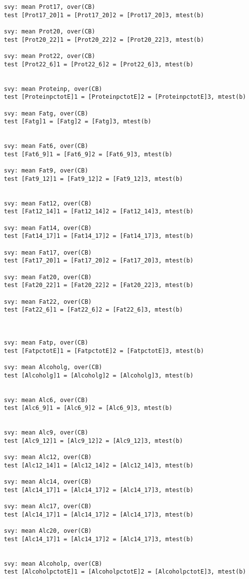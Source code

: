 \documentclass[]{article}
\begin{document}
\begin{verbatim}
svy: mean Prot17, over(CB)
test [Prot17_20]1 = [Prot17_20]2 = [Prot17_20]3, mtest(b) 

svy: mean Prot20, over(CB)
test [Prot20_22]1 = [Prot20_22]2 = [Prot20_22]3, mtest(b) 

svy: mean Prot22, over(CB)
test [Prot22_6]1 = [Prot22_6]2 = [Prot22_6]3, mtest(b) 


svy: mean Proteinp, over(CB)
test [ProteinpctotE]1 = [ProteinpctotE]2 = [ProteinpctotE]3, mtest(b) 

svy: mean Fatg, over(CB)
test [Fatg]1 = [Fatg]2 = [Fatg]3, mtest(b) 


svy: mean Fat6, over(CB)
test [Fat6_9]1 = [Fat6_9]2 = [Fat6_9]3, mtest(b) 

svy: mean Fat9, over(CB)
test [Fat9_12]1 = [Fat9_12]2 = [Fat9_12]3, mtest(b) 


svy: mean Fat12, over(CB)
test [Fat12_14]1 = [Fat12_14]2 = [Fat12_14]3, mtest(b) 

svy: mean Fat14, over(CB)
test [Fat14_17]1 = [Fat14_17]2 = [Fat14_17]3, mtest(b) 

svy: mean Fat17, over(CB)
test [Fat17_20]1 = [Fat17_20]2 = [Fat17_20]3, mtest(b) 

svy: mean Fat20, over(CB)
test [Fat20_22]1 = [Fat20_22]2 = [Fat20_22]3, mtest(b) 

svy: mean Fat22, over(CB)
test [Fat22_6]1 = [Fat22_6]2 = [Fat22_6]3, mtest(b) 



svy: mean Fatp, over(CB)
test [FatpctotE]1 = [FatpctotE]2 = [FatpctotE]3, mtest(b) 

svy: mean Alcoholg, over(CB)
test [Alcoholg]1 = [Alcoholg]2 = [Alcoholg]3, mtest(b) 


svy: mean Alc6, over(CB)
test [Alc6_9]1 = [Alc6_9]2 = [Alc6_9]3, mtest(b) 


svy: mean Alc9, over(CB)
test [Alc9_12]1 = [Alc9_12]2 = [Alc9_12]3, mtest(b) 

svy: mean Alc12, over(CB)
test [Alc12_14]1 = [Alc12_14]2 = [Alc12_14]3, mtest(b) 

svy: mean Alc14, over(CB)
test [Alc14_17]1 = [Alc14_17]2 = [Alc14_17]3, mtest(b) 

svy: mean Alc17, over(CB)
test [Alc14_17]1 = [Alc14_17]2 = [Alc14_17]3, mtest(b) 

svy: mean Alc20, over(CB)
test [Alc14_17]1 = [Alc14_17]2 = [Alc14_17]3, mtest(b) 


svy: mean Alcoholp, over(CB)
test [AlcoholpctotE]1 = [AlcoholpctotE]2 = [AlcoholpctotE]3, mtest(b) 



\end{verbatim}
\end{document}
